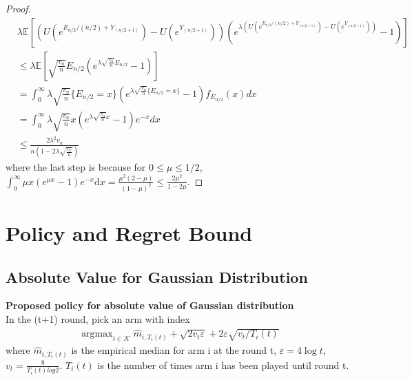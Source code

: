 \documentclass{article}
\DeclareMathOperator*{\argmax}{argmax}
\theoremstyle{plain}
\begin{document}
\begin{proof}
\begin{align}
    & \lambda \mathbb{E}[\left(U\left(e^{E_{n / 2} /(n / 2)+Y_{(n / 2+1)}} \right)-U\left(e^{Y_{(n / 2+1)}}\right) \right) \left(e^{\lambda \left (U\left(e^{E_{n / 2} /(n / 2)+Y_{(n / 2+1)}} \right)-U\left(e^{Y_{(n / 2+1)}}\right) \right)} - 1\right)]\\
    & \leq \lambda \mathbb{E}[\sqrt{\frac{v_{n}}{n}} E_{n / 2} \left(e^{\lambda \sqrt{\frac{v_{n}}{n}} E_{n / 2}} -1\right)]\\
    & = \int_0^\infty \lambda  \sqrt{\frac{v_{n}}{n}} \{ E_{n / 2}  = x \} \left(e^{\lambda \sqrt{\frac{v_{n}}{n}} \{E_{n / 2} = x\}} -1\right) f_{E_{n/2}}(x) d x\\
    & = \int_0^\infty \lambda  \sqrt{\frac{v_{n}}{n}} x \left(e^{\lambda \sqrt{\frac{v_{n}}{n}} x } -1\right) e^{-x} d x\\
    & \leq \frac{2\lambda^2 v_n}{n (1 - 2 \lambda \sqrt{\frac{v_n}{n}})}
\end{align}
where the last step is because for $0 \leq \mu \leq 1/2$, $\int_{0}^{\infty} \mu x\left(e^{\mu x}-1\right) e^{-x} \mathrm{d} x=\frac{\mu^{2}(2-\mu)}{(1-\mu)^{2}} \leq \frac{2 \mu^{2}}{1-2 \mu}$.

\end{proof}


    
    
\section{Policy and Regret Bound}

\subsection{Absolute Value for Gaussian Distribution}

\textbf{Proposed policy for absolute value of Gaussian distribution}\\
In the (t+1) round, pick an arm with index 
\begin{align}
    \label{policy normal}
   \argmax_{i \in \mathcal{K}} \hat{m}_{i, T_i(t)} + \sqrt{2v_t \varepsilon} + 2 \varepsilon \sqrt{v_t/T_i(t)}
\end{align}
where $\hat{m}_{i, T_i(t)}$ is the empirical median for arm i at the round t, $\varepsilon = 4 \log t$, $v_t = \frac{8}{T_i(t) log2}$. $T_i(t)$ is the number of times arm i has been played until round t.  
\end{document}
